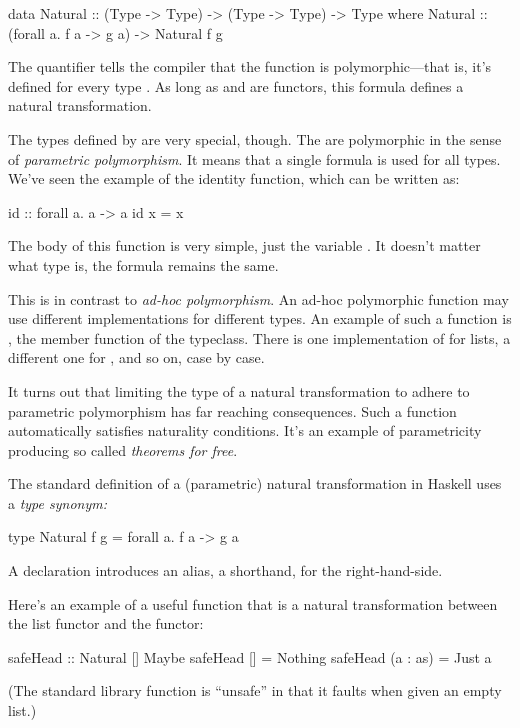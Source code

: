 \documentclass[DaoFP]{subfiles}
\begin{document}
\begin{haskell}
data Natural :: (Type -> Type) -> (Type -> Type) -> Type where
  Natural :: (forall a. f a -> g a) -> Natural f g
\end{haskell}
The  quantifier tells the compiler that the function is polymorphic---that is, it's defined for every type . As long as  and  are functors, this formula defines a natural transformation. 

The types defined by  are very special, though. The are polymorphic in the sense of \emph{parametric polymorphism}. It means that a single formula is used for all types. We've seen the example of the identity function, which can be written as:
\begin{haskell}
id :: forall a. a -> a
id x = x
\end{haskell}
The body of this function is very simple, just the variable . It doesn't matter what type  is, the formula remains the same.

This is in contrast to \emph{ad-hoc polymorphism}. An ad-hoc polymorphic function may use different implementations for different types. An example of such a function is , the member function of the  typeclass. There is one implementation of  for lists, a different one for , and so on, case by case. 

It turns out that limiting the type of a natural transformation to adhere to parametric polymorphism has far reaching consequences. Such a function automatically satisfies naturality conditions. It's an example of parametricity producing so called \emph{theorems for free}. 

The standard definition of a (parametric) natural transformation in Haskell uses a \emph{type synonym:}
\begin{haskell}
type Natural f g = forall a. f a -> g a
\end{haskell}
A  declaration introduces an alias, a shorthand, for the right-hand-side.

Here's an example of a useful function that is a natural transformation between the list functor and the  functor:
\begin{haskell}
safeHead :: Natural [] Maybe
safeHead [] = Nothing
safeHead (a : as) = Just a
\end{haskell}
(The standard library  function is ``unsafe'' in that it faults when given an empty list.)
\end{document}
